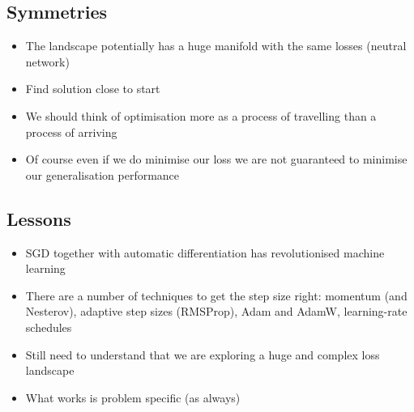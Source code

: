 
\begin{slide}
\section[-2]{Symmetries}

\pb\pause
\begin{minipage}{0.6\linewidth}
  \begin{itemize}
\item The landscape potentially has a huge manifold with the same
  losses (neutral network)\pauseh
\item Find solution close to start\pauseh {}
\item We should think of optimisation more as a process of
  travelling than a process of arriving\pauseh
\item Of course even if we do minimise our loss we are not
  guaranteed to minimise our generalisation performance\pauseh
\end{itemize}\hfill
\end{minipage}
\begin{minipage}{0.35\linewidth}
  \begin{flushright}
    \pause
  \end{flushright}
\end{minipage}

\end{slide}


\begin{slide}
\section{Lessons}

\begin{PauseHighLight}
  \begin{itemize}
  \item SGD together with automatic differentiation has revolutionised
    machine learning\pause
  \item There are a number of techniques to get the step size
    right\pause: momentum (and Nesterov)\pauseb, adaptive step sizes
    (RMSProp)\pauseb, Adam and AdamW\pauseb, learning-rate schedules\pauseb
  \item Still need to understand that we are exploring a huge and
    complex loss landscape\pause
  \item What works is problem specific\pause{} (as always)\pauseb
  \end{itemize}
\end{PauseHighLight}

\end{slide}



